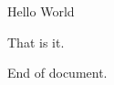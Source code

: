 \documentclass{article}
\begin{document}
Hello World
\begin{foodriwo}
That is it.
\end{foodriwo}
End of document.
\end{document}
